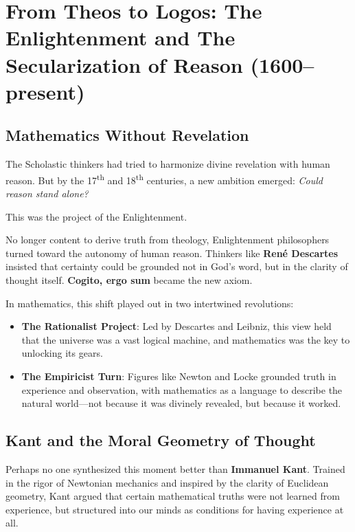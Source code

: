 \section{From Theos to Logos: The Enlightenment and The Secularization of Reason (1600–present)}

\subsection{Mathematics Without Revelation}

The Scholastic thinkers had tried to harmonize divine revelation with human reason. But by the 17\textsuperscript{th} and 18\textsuperscript{th} centuries, a new ambition emerged: \textit{Could reason stand alone?}

This was the project of the Enlightenment.

No longer content to derive truth from theology, Enlightenment philosophers turned toward the autonomy of human reason. Thinkers like \textbf{René Descartes} insisted that certainty could be grounded not in God’s word, but in the clarity of thought itself. \textbf{Cogito, ergo sum} became the new axiom.

\medskip

In mathematics, this shift played out in two intertwined revolutions:

\begin{itemize}
    \item \textbf{The Rationalist Project}: Led by Descartes and Leibniz, this view held that the universe was a vast logical machine, and mathematics was the key to unlocking its gears.
    \item \textbf{The Empiricist Turn}: Figures like Newton and Locke grounded truth in experience and observation, with mathematics as a language to describe the natural world—not because it was divinely revealed, but because it worked.
\end{itemize}

\subsection{Kant and the Moral Geometry of Thought}

Perhaps no one synthesized this moment better than \textbf{Immanuel Kant}. Trained in the rigor of Newtonian mechanics and inspired by the clarity of Euclidean geometry, Kant argued that certain mathematical truths were not learned from experience, but structured into our minds as conditions for having experience at all.

